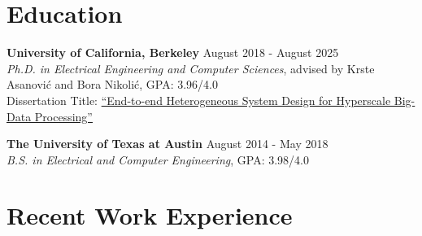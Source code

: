 \documentclass[line]{res}
\begin{document}
\address{\href{https://abejgonzalez.github.io}{https://abejgonzalez.github.io} $|$ \href{mailto:abegonzalez@google.com}{abegonzalez@google.com} $|$ \href{https://www.linkedin.com/in/abraham-j-gonzalez/}{linkedin.com/in/abraham-j-gonzalez}}

\begin{resume}

\vspace{-8mm}

\section{\Large{Education}}
\label{sec:education}
\vspace{1mm}

\textbf{University of California, Berkeley} \hfill August 2018 - August 2025
\\
\textit{Ph.D. in Electrical Engineering and Computer Sciences}, advised by Krste Asanovi\'c and Bora Nikoli\'c, GPA: 3.96/4.0
\\
Dissertation Title: \href{https://www2.eecs.berkeley.edu/Pubs/TechRpts/2025/31916.html}{``End-to-end Heterogeneous System Design for Hyperscale Big-Data Processing''}

\vspace{-3mm}

\textbf{The University of Texas at Austin} \hfill August 2014 - May 2018
\\
\textit{B.S. in Electrical and Computer Engineering}, GPA: 3.98/4.0

\vspace{-3mm}

\section{\Large{Recent Work Experience}}
\label{sec:jobs}
\vspace{1mm}


\end{resume}
\end{document}

